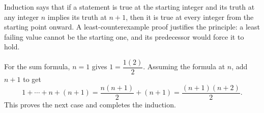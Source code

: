 Induction says that if a statement is true at the starting integer and its truth at any integer $n$ implies its truth at $n+1$, then it is true at every integer from the starting point onward. A least-counterexample proof justifies the principle: a least failing value cannot be the starting one, and its predecessor would force it to hold.

For the sum formula, $n=1$ gives $1=\dfrac{1(2)}{2}$. Assuming the formula at $n$, add $n+1$ to get
\[
1+\cdots+n+(n+1)=\dfrac{n(n+1)}{2}+(n+1)
=\dfrac{(n+1)(n+2)}{2}.
\]
This proves the next case and completes the induction.
